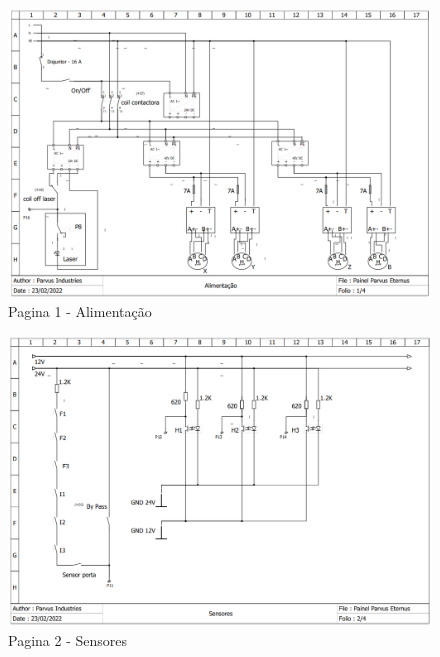 \documentclass[
	article,			%
	11pt,				%
	oneside,			%
	a4paper,			%
	section=TITLE,		%
	english,			%
	brazil,				%
	sumario=tradicional
	]{abntex2}
\begin{document}
%  
% 
% 
% 

\begin{landscape}
\begin{figure}[H]
    \centering
    \includegraphics[height=0.95\textwidth]{img/p1 ali.PNG}
    \caption{Pagina 1 - Alimentação}
    \label{fig:p1}
\end{figure}

\begin{figure}[H]
    \centering
    \includegraphics[height=1\textwidth]{img/p2 sens.PNG}
    \caption{Pagina 2 - Sensores}
    \label{fig:p2}
\end{figure}


\end{landscape}
\end{document}
